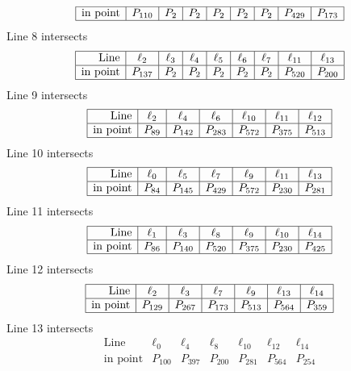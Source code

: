 \documentclass{article}
\begin{document}
{$$\begin{array}{|r*{8}{|c}|}
\hline
\mbox{in point}  & P_{110} & P_{2} & P_{2} & P_{2} & P_{2} & P_{2} & P_{429} & P_{173}\\
\hline
\end{array}
$$
Line 8 intersects 
$$
\begin{array}{|r*{8}{|c}|}
\hline
\mbox{Line}  & \ell_{2} & \ell_{3} & \ell_{4} & \ell_{5} & \ell_{6} & \ell_{7} & \ell_{11} & \ell_{13}\\
\hline
\mbox{in point}  & P_{137} & P_{2} & P_{2} & P_{2} & P_{2} & P_{2} & P_{520} & P_{200}\\
\hline
\end{array}
$$
Line 9 intersects 
$$
\begin{array}{|r*{6}{|c}|}
\hline
\mbox{Line}  & \ell_{2} & \ell_{4} & \ell_{6} & \ell_{10} & \ell_{11} & \ell_{12}\\
\hline
\mbox{in point}  & P_{89} & P_{142} & P_{283} & P_{572} & P_{375} & P_{513}\\
\hline
\end{array}
$$
Line 10 intersects 
$$
\begin{array}{|r*{6}{|c}|}
\hline
\mbox{Line}  & \ell_{0} & \ell_{5} & \ell_{7} & \ell_{9} & \ell_{11} & \ell_{13}\\
\hline
\mbox{in point}  & P_{84} & P_{145} & P_{429} & P_{572} & P_{230} & P_{281}\\
\hline
\end{array}
$$
Line 11 intersects 
$$
\begin{array}{|r*{6}{|c}|}
\hline
\mbox{Line}  & \ell_{1} & \ell_{3} & \ell_{8} & \ell_{9} & \ell_{10} & \ell_{14}\\
\hline
\mbox{in point}  & P_{86} & P_{140} & P_{520} & P_{375} & P_{230} & P_{425}\\
\hline
\end{array}
$$
Line 12 intersects 
$$
\begin{array}{|r*{6}{|c}|}
\hline
\mbox{Line}  & \ell_{2} & \ell_{3} & \ell_{7} & \ell_{9} & \ell_{13} & \ell_{14}\\
\hline
\mbox{in point}  & P_{129} & P_{267} & P_{173} & P_{513} & P_{564} & P_{359}\\
\hline
\end{array}
$$
Line 13 intersects 
$$
\begin{array}{|r*{6}{|c}|}
\hline
\mbox{Line}  & \ell_{0} & \ell_{4} & \ell_{8} & \ell_{10} & \ell_{12} & \ell_{14}\\
\hline
\mbox{in point}  & P_{100} & P_{397} & P_{200} & P_{281} & P_{564} & P_{254}\\

\end{array}$$}
\end{document}
